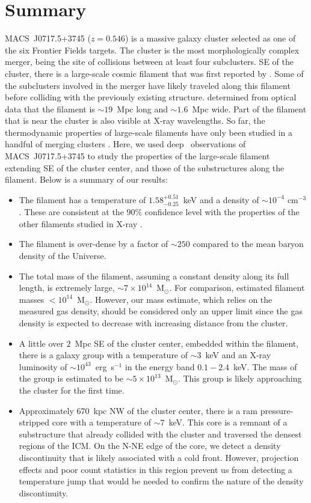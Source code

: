 \section{Summary}
\label{sec:Summary}

MACS~J0717.5+3745 ($z=0.546$) is a massive galaxy cluster selected as one of the six Frontier Fields targets. The cluster is the most morphologically complex merger, being the site of collisions between at least four subclusters. SE of the cluster, there is a large-scale cosmic filament that was first reported by \citet{Ebeling2004}. Some of the subclusters involved in the merger have likely traveled along this filament before colliding with the previously existing structure. \citet{Jauzac2012} determined from optical data that the filament is $\sim 19$~Mpc long and $\sim 1.6$~Mpc wide. Part of the filament that is near the cluster is also visible at X-ray wavelengths. So far, the thermodynamic properties of large-scale filaments have only been studied in a handful of merging clusters \citep{Werner2008, Eckert2015, Bulbul2016}. Here, we used deep \chandra\ observations of MACS~J0717.5+3745 to study the properties of the large-scale filament extending SE of the cluster center, and those of the substructures along the filament. Below is a summary of our results:

\begin{itemize}
	\item The filament has a temperature of $1.58_{-0.25}^{+0.51}$~keV and a density of $\sim 10^{-4}$ cm$^{-3}$. These are consistent at the $90\%$ confidence level with the properties of the other filaments studied in X-ray \citep{Werner2008, Eckert2015, Bulbul2016}.
	\item The filament is over-dense by a factor of $\sim 250$ compared to the mean baryon density of the Universe.
	\item The total mass of the filament, assuming a constant density along its full length, is extremely large, $\sim 7\times 10^{14}$~M$_\odot$. For comparison, \citet{Eckert2015} estimated filament masses $<10^{14}$~M$_\odot$. However, our mass estimate,  which relies on the measured gas density, should be considered only an upper limit since the gas density is expected to decrease with increasing distance from the cluster.
	\item A little over $2$~Mpc SE of the cluster center, embedded within the filament, there is a galaxy group with a temperature of $\sim 3$~keV and an X-ray luminosity of $\sim 10^{43}$~erg~s$^{-1}$ in the energy band $0.1-2.4$~keV. The mass of the group is estimated to be $\sim 5\times 10^{13}$~M$_\odot$. This group is likely approaching the cluster for the first time.
	\item Approximately $670$~kpc NW of the cluster center, there is a ram pressure-stripped core with a temperature of $\sim 7$~keV. This core is a remnant of a substructure that already collided with the cluster and traversed the densest regions of the ICM. On the N-NE edge of the core, we detect a density discontinuity that is likely associated with a cold front. However, projection effects and poor count statistics in this region prevent us from detecting a temperature jump that would be needed to confirm the nature of the density discontinuity.
\end{itemize}